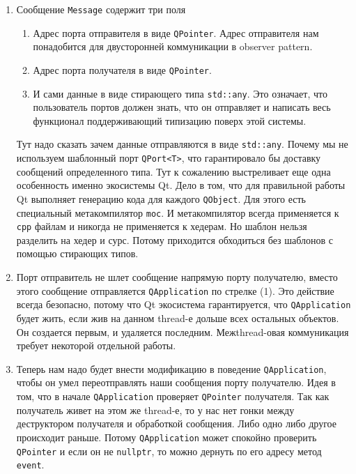 \begin{enumerate}
\item Сообщение \verb"Message" содержит три поля
\begin{enumerate}
\item Адрес порта отправителя в виде \verb"QPointer".
Адрес отправителя нам понадобится для двусторонней коммуникации в observer pattern.

\item Адрес порта получателя в виде \verb"QPointer".

\item И сами данные в виде стирающего типа \verb"std::any".
Это означает, что пользователь портов должен знать, что он отправляет и написать весь функционал поддерживающий типизацию поверх этой системы.
\end{enumerate}
Тут надо сказать зачем данные отправляются в виде \verb"std::any".
Почему мы не используем шаблонный порт \verb"QPort<T>", что гарантировало бы доставку сообщений определенного типа.
Тут к сожалению выстреливает еще одна особенность именно экосистемы Qt.
Дело в том, что для правильной работы Qt выполняет генерацию кода для каждого \verb"QObject".
Для этого есть специальный метакомпилятор \verb"moc".
И метакомпилятор всегда применяется к \verb"cpp" файлам и никогда не применяется к хедерам.
Но шаблон нельзя разделить на хедер и сурс.
Потому приходится обходиться без шаблонов с помощью стирающих типов.

\item Порт отправитель не шлет сообщение напрямую порту получателю, вместо этого сообщение отправляется \verb"QApplication" по стрелке (1).
Это действие всегда безопасно, потому что Qt экосистема гарантируется, что \verb"QApplication" будет жить, если жив на данном thread-е дольше всех остальных объектов.
Он создается первым, и удаляется последним.
Межthread-овая коммуникация требует некоторой отдельной работы.

\item Теперь нам надо будет внести модификацию в поведение \verb"QApplication", чтобы он умел переотправлять наши сообщения порту получателю.
Идея в том, что в начале \verb"QApplication" проверяет \verb"QPointer" получателя.
Так как получатель живет на этом же thread-е, то у нас нет гонки между деструктором получателя и обработкой сообщения.
Либо одно либо другое происходит раньше.
Потому \verb"QApplication" может спокойно проверить \verb"QPointer" и если он не \verb"nullptr", то можно дернуть по его адресу метод \verb"event".
\end{enumerate}

